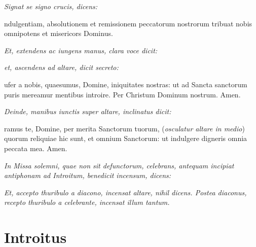 
\textit{Signat se signo crucis, dicens:}

ndulgentiam, \cross{} absolutionem et remissionem peccatorum
nostrorum tribuat nobis omnipotens et misericors Dominus.


\textit{Et, extendens ac iungens manus, clara voce dicit:}



\textit{et, ascendens ad altare, dicit secreto:}

ufer a nobis, quaesumus, Domine, iniquitates nostras: ut ad Sancta
sanctorum puris mereamur mentibus introire.  Per Christum Dominum nostrum.
Amen.

\textit{Deinde, manibus iunctis super altare, inclinatus dicit:}

ramus te, Domine, per merita Sanctorum tuorum, (\textit{osculatur
altare in medio}) quorum reliquiae hic sunt, et omnium Sanctorum: ut indulgere
digneris omnia peccata mea.  Amen.

\textit{%
    In Missa solemni, quae non sit defunctorum, celebrans, antequam incipiat
    antiphonam ad Introitum, benedicit incensum, dicens:
}


\textit{%
    Et, accepto thuribulo a diacono, incensat altare, nihil dicens.  Postea
    diaconus, recepto thuribulo a celebrante, incensat illum tantum.
}

\section{Introitus}

